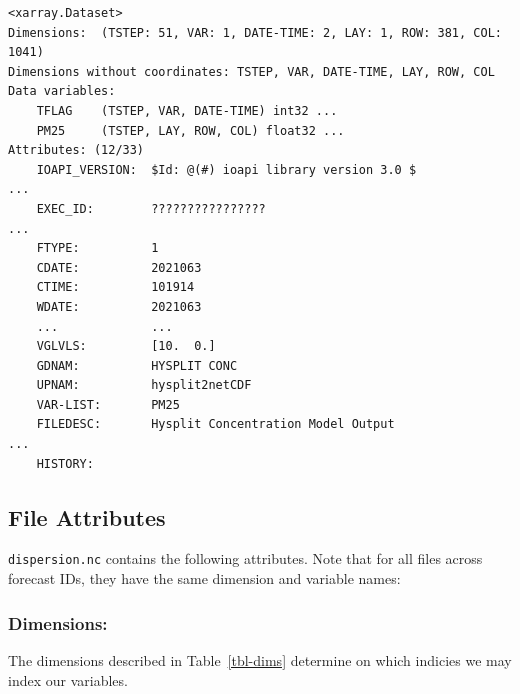 \documentclass[
  letterpaper,
  DIV=11,
  numbers=noendperiod]{scrreprt}
\begin{document}
\begin{verbatim}
<xarray.Dataset>
Dimensions:  (TSTEP: 51, VAR: 1, DATE-TIME: 2, LAY: 1, ROW: 381, COL: 1041)
Dimensions without coordinates: TSTEP, VAR, DATE-TIME, LAY, ROW, COL
Data variables:
    TFLAG    (TSTEP, VAR, DATE-TIME) int32 ...
    PM25     (TSTEP, LAY, ROW, COL) float32 ...
Attributes: (12/33)
    IOAPI_VERSION:  $Id: @(#) ioapi library version 3.0 $                    ...
    EXEC_ID:        ????????????????                                         ...
    FTYPE:          1
    CDATE:          2021063
    CTIME:          101914
    WDATE:          2021063
    ...             ...
    VGLVLS:         [10.  0.]
    GDNAM:          HYSPLIT CONC    
    UPNAM:          hysplit2netCDF  
    VAR-LIST:       PM25            
    FILEDESC:       Hysplit Concentration Model Output                       ...
    HISTORY:        
\end{verbatim}

\subsection{File Attributes}\label{file-attributes}

\texttt{dispersion.nc} contains the following attributes. Note that for
all files across forecast IDs, they have the same dimension and variable
names:

\subsubsection{Dimensions:}\label{dimensions}

The dimensions described in Table~\ref{tbl-dims} determine on which
indicies we may index our variables.
\end{document}
